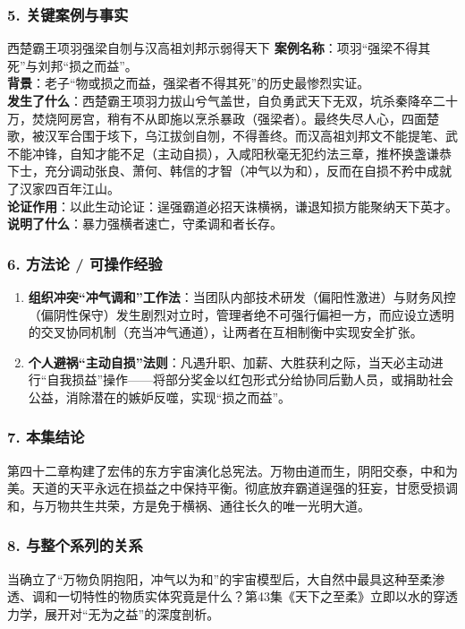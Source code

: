 \subsubsection{5. 关键案例与事实}
\begin{CaseBox}{西楚霸王项羽强梁自刎与汉高祖刘邦示弱得天下}
\textbf{案例名称}：项羽“强梁不得其死”与刘邦“损之而益”。\\
\textbf{背景}：老子“物或损之而益，强梁者不得其死”的历史最惨烈实证。\\
\textbf{发生了什么}：西楚霸王项羽力拔山兮气盖世，自负勇武天下无双，坑杀秦降卒二十万，焚烧阿房宫，稍有不从即施以烹杀暴政（强梁者）。最终失尽人心，四面楚歌，被汉军合围于垓下，乌江拔剑自刎，不得善终。而汉高祖刘邦文不能提笔、武不能冲锋，自知才能不足（主动自损），入咸阳秋毫无犯约法三章，推杯换盏谦恭下士，充分调动张良、萧何、韩信的才智（冲气以为和），反而在自损不矜中成就了汉家四百年江山。\\
\textbf{论证作用}：以此生动论证：逞强霸道必招天诛横祸，谦退知损方能聚纳天下英才。\\
\textbf{说明了什么}：暴力强横者速亡，守柔调和者长存。
\end{CaseBox}

\subsubsection{6. 方法论 / 可操作经验}
\begin{enumerate}
    \item \textbf{组织冲突“冲气调和”工作法}：当团队内部技术研发（偏阳性激进）与财务风控（偏阴性保守）发生剧烈对立时，管理者绝不可强行偏袒一方，而应设立透明的交叉协同机制（充当冲气通道），让两者在互相制衡中实现安全扩张。
    \item \textbf{个人避祸“主动自损”法则}：凡遇升职、加薪、大胜获利之际，当天必主动进行“自我损益”操作——将部分奖金以红包形式分给协同后勤人员，或捐助社会公益，消除潜在的嫉妒反噬，实现“损之而益”。
\end{enumerate}

\subsubsection{7. 本集结论}
第四十二章构建了宏伟的东方宇宙演化总宪法。万物由道而生，阴阳交泰，中和为美。天道的天平永远在损益之中保持平衡。彻底放弃霸道逞强的狂妄，甘愿受损调和，与万物共生共荣，方是免于横祸、通往长久的唯一光明大道。

\subsubsection{8. 与整个系列的关系}
当确立了“万物负阴抱阳，冲气以为和”的宇宙模型后，大自然中最具这种至柔渗透、调和一切特性的物质实体究竟是什么？第43集《天下之至柔》立即以水的穿透力学，展开对“无为之益”的深度剖析。

